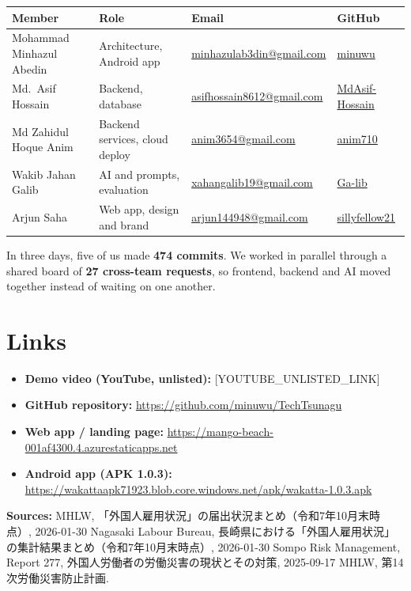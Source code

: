 \documentclass[11pt,a4paper]{article}
\begin{document}
{\small
\setlength{\tabcolsep}{4pt}
\begin{tabularx}{\linewidth}{@{}l >{\raggedright\arraybackslash}X l l@{}}
\toprule
\textbf{Member} & \textbf{Role} & \textbf{Email} & \textbf{GitHub} \\
\midrule
Mohammad Minhazul Abedin & Architecture, Android app & \href{mailto:minhazulab3din@gmail.com}{minhazulab3din@gmail.com} & \href{https://github.com/minuwu}{minuwu} \\
Md.~Asif Hossain & Backend, database & \href{mailto:asifhossain8612@gmail.com}{asifhossain8612@gmail.com} & \href{https://github.com/MdAsif-Hossain}{MdAsif-Hossain} \\
Md Zahidul Hoque Anim & Backend services, cloud deploy & \href{mailto:anim3654@gmail.com}{anim3654@gmail.com} & \href{https://github.com/anim710}{anim710} \\
Wakib Jahan Galib & AI and prompts, evaluation & \href{mailto:xahangalib19@gmail.com}{xahangalib19@gmail.com} & \href{https://github.com/Ga-lib}{Ga-lib} \\
Arjun Saha & Web app, design and brand & \href{mailto:arjun144948@gmail.com}{arjun144948@gmail.com} & \href{https://github.com/sillyfellow21}{sillyfellow21} \\
\bottomrule
\end{tabularx}
}

In three days, five of us made \textbf{474 commits}. We worked in parallel through a shared board of \textbf{27 cross-team requests}, so frontend, backend and AI moved together instead of waiting on one another.

\section{Links}

\begin{itemize}
  \item \textbf{Demo video (YouTube, unlisted):} [YOUTUBE\_UNLISTED\_LINK]
  \item \textbf{GitHub repository:} \url{https://github.com/minuwu/TechTsunagu}
  \item \textbf{Web app / landing page:} \url{https://mango-beach-001af4300.4.azurestaticapps.net}
  \item \textbf{Android app (APK 1.0.3):} \url{https://wakattaapk71923.blob.core.windows.net/apk/wakatta-1.0.3.apk}
\end{itemize}

\vspace{1ex}
{\footnotesize\textbf{Sources:} MHLW, 「外国人雇用状況」の届出状況まとめ（令和7年10月末時点）, 2026-01-30 \textperiodcentered{} Nagasaki Labour Bureau, 長崎県における「外国人雇用状況」の集計結果まとめ（令和7年10月末時点）, 2026-01-30 \textperiodcentered{} Sompo Risk Management, Report 277, 外国人労働者の労働災害の現状とその対策, 2025-09-17 \textperiodcentered{} MHLW, 第14次労働災害防止計画.\par}
\end{document}
